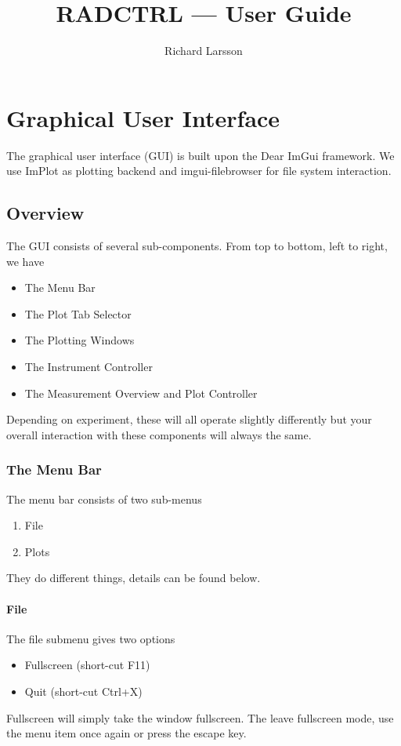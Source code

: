 \documentclass[a4paper,10pt]{book}
\title{RADCTRL --- User Guide}
\author{Richard Larsson}
\begin{document}
\maketitle

\tableofcontents

\chapter{Graphical User Interface}
The graphical user interface (GUI)  is built upon the Dear ImGui \citep{DearImGui}
framework.  We use ImPlot \citep{ImPlot} as plotting backend and imgui-filebrowser \citep{imgui-filebrowser} for file system interaction.

\section{Overview}
The GUI  consists of several sub-components.  From top to bottom, left to right, we have
\begin{itemize}
 \item The Menu Bar 
 \item The Plot Tab Selector
 \item The Plotting Windows
 \item The Instrument Controller
 \item The Measurement Overview and Plot Controller
\end{itemize}
Depending on experiment, these will all operate slightly differently but your overall interaction with these components will always the same.

\subsection{The Menu Bar}
The menu bar  consists of two sub-menus
\begin{enumerate}
 \item File
 \item Plots
\end{enumerate}
They do different things, details can be found below.

\subsubsection{File}
The file submenu gives two options
\begin{itemize}
 \item Fullscreen (short-cut F11)
 \item Quit (short-cut Ctrl+X)
\end{itemize}
Fullscreen will simply take the window fullscreen.  The leave fullscreen mode, use the menu item once again or press the escape key.
\end{document}
